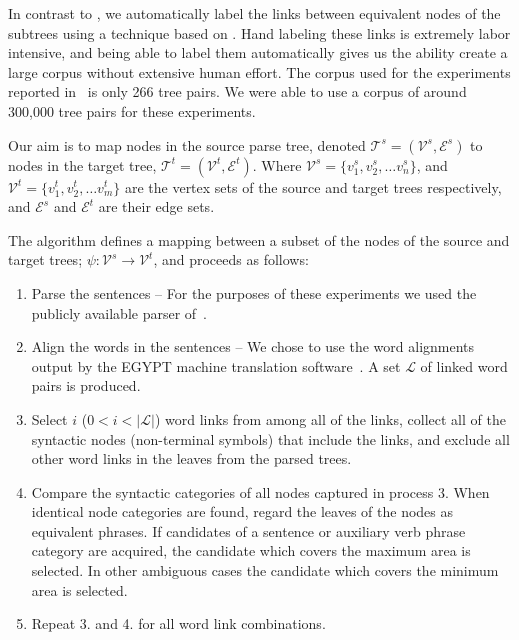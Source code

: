 In contrast to \cite{poutsma:98}, we automatically label the links between equivalent nodes of the subtrees using a
technique based on \cite{Imamura:PhraseAlignment2001-2}. Hand labeling these links is extremely labor intensive, and 
being able to label them automatically gives us the ability create a large corpus without extensive human effort. 
The corpus used for the experiments reported in~\cite{poutsma:98} is only 266 tree pairs. We were able to use a corpus
of around 300,000 tree pairs for these experiments.  

Our aim is to map nodes in the source parse tree, denoted $\mathscr T^s=(\mathscr{V}^s, \mathscr{E}^s)$
to nodes in the  target tree, $\mathscr T^t=(\mathscr{V}^t, \mathscr{E}^t)$. Where $\mathscr{V}^s = \{v^s_1, v^s_2, \dots v^s_n\}$,
and $\mathscr{V}^t = \{v^t_1, v^t_2, \dots v^t_m\}$ are the vertex sets of the source and target trees respectively, and 
$\mathscr{E}^s$ and $\mathscr{E}^t$ are their edge sets.

The algorithm defines a mapping between a subset of the nodes of the source and target trees;
$\psi : \mathscr{V}^s \to \mathscr{V}^t$, and proceeds as follows:

\begin{enumerate}
\item  Parse the sentences --
For the purposes of these experiments we used the publicly available parser 
of~\cite{charniak99maximumentropyinspired}.

\item Align the words in the sentences --
We chose to use the word alignments output by the EGYPT machine translation 
software~\cite{al-onaizan:99}.
A set $\mathscr{L}$ of linked word pairs is produced.

\item Select $i$ ($0 < i < \vert\mathscr{L}\vert$) word links from among all of the links, collect all of the syntactic nodes (non-terminal symbols)
that include the links, and exclude all other word links in the leaves from the parsed trees.

\item Compare the syntactic categories of all nodes captured in process 3. When
identical node categories are found, regard the leaves of the nodes as equivalent
phrases. If candidates of a sentence or auxiliary verb phrase category are acquired,
the candidate which covers the maximum area is selected. In other ambiguous cases the
candidate which covers the minimum area is selected.

\item Repeat 3. and 4. for all word link combinations.

\end{enumerate}

